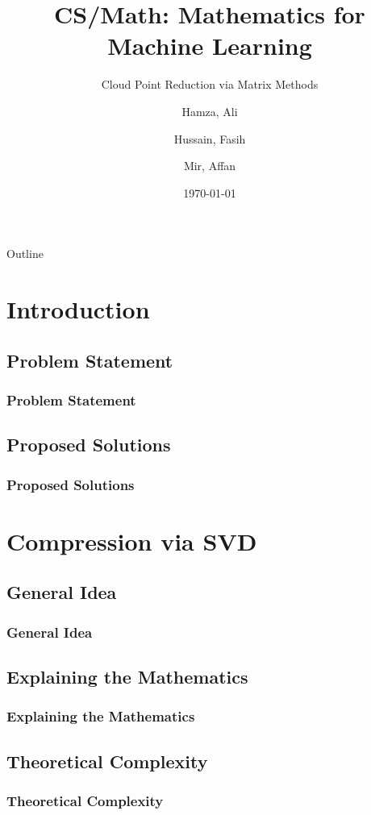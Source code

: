 \documentclass{beamer}
\title %
{CS/Math: Mathematics for Machine Learning}
\subtitle{Cloud Point Reduction via Matrix Methods}
\author[Hamza, Hussain, Mir] %
{Hamza, Ali \and Hussain, Fasih \and Mir, Affan}
\institute{Habib University} %
\date{\today} %
\begin{document}
\begin{frame}
  \titlepage
\end{frame}
\setcounter{tocdepth}{1}
\begin{frame}{Outline}

    \tableofcontents
\end{frame}

\section{Introduction}

\subsection{Problem Statement}
\begin{frame}
  \frametitle{Problem Statement}
\end{frame}

\subsection{Proposed Solutions}
\begin{frame}
  \frametitle{Proposed Solutions}
\end{frame}

\section{Compression via SVD}

\subsection{General Idea}
\begin{frame}
  \frametitle{General Idea}
\end{frame}
\subsection{Explaining the Mathematics}
\begin{frame}
  \frametitle{Explaining the Mathematics}
\end{frame}
\subsection{Theoretical Complexity}
\begin{frame}
  \frametitle{Theoretical Complexity}
\end{frame}
\end{document}
